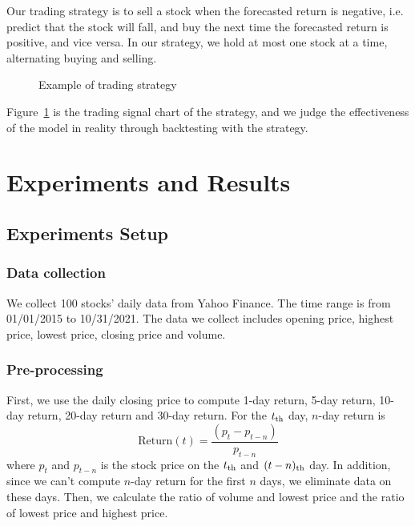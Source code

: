 \documentclass{article}
\begin{document}
\hspace{16}Our trading strategy is to sell a stock when the forecasted return is negative, i.e. predict that the stock will fall, and buy the next time the forecasted return is positive, and vice versa. In our strategy, we hold at most one stock at a time, alternating buying and selling.


\begin{figure}[htbp]
    \caption{Example of trading strategy}
    \label{fig:strategy}
\end{figure}
\hspace{16}Figure~\ref{fig:strategy} is the trading signal chart of the strategy, and we judge the effectiveness of the model in reality through backtesting with the strategy.


\section{Experiments and Results}
\subsection{Experiments Setup}
\subsubsection{Data collection}
\hspace{16}We collect 100 stocks' daily data from Yahoo Finance. The time range is from 01/01/2015 to 10/31/2021. The data we collect includes opening price, highest price, lowest price, closing price and volume.

\subsubsection{Pre-processing}
\hspace{16}First, we use the daily closing price to compute 1-day return, 5-day return, 10-day return, 20-day return and 30-day return. For the $t_{\rm{th}}$ day, $n$-day return is
\begin{equation*}
    \textrm{Return}(t) = \frac{(p_t - p_{t-n})}{p_{t-n}}
\end{equation*}
where $p_t$ and $p_{t-n}$ is the stock price on the $t_{\rm{th}}$ and $(t-n)_{\rm{th}}$ day.
In addition, since we can't compute $n$-day return for the first $n$ days, we eliminate data on these days. Then, we calculate the ratio of volume and lowest price and the ratio of lowest price and highest price.
\end{document}
